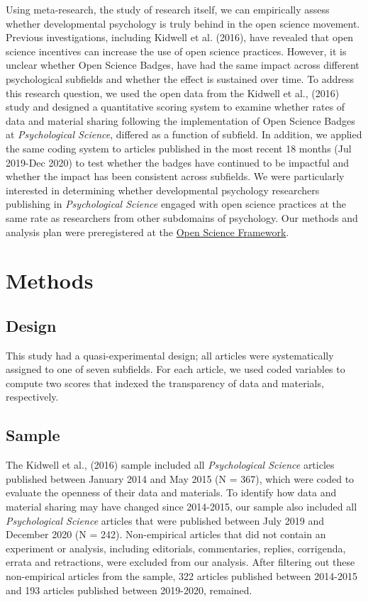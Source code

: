 \documentclass[
  english,
  man,floatsintext]{apa6}
\begin{document}
Using meta-research, the study of research itself, we can empirically assess whether developmental psychology is truly behind in the open science movement. Previous investigations, including Kidwell et al. (2016), have revealed that open science incentives can increase the use of open science practices. However, it is unclear whether Open Science Badges, have had the same impact across different psychological subfields and whether the effect is sustained over time. To address this research question, we used the open data from the Kidwell et al., (2016) study and designed a quantitative scoring system to examine whether rates of data and material sharing following the implementation of Open Science Badges at \emph{Psychological Science}, differed as a function of subfield. In addition, we applied the same coding system to articles published in the most recent 18 months (Jul 2019-Dec 2020) to test whether the badges have continued to be impactful and whether the impact has been consistent across subfields. We were particularly interested in determining whether developmental psychology researchers publishing in \emph{Psychological Science} engaged with open science practices at the same rate as researchers from other subdomains of psychology. Our methods and analysis plan were preregistered at the \href{https://osf.io/gqv9n/?view_only=b97cd4c4f6d645bc9e8870d97b6f3da4}{Open Science Framework}.

\hypertarget{methods}{%
\section{Methods}\label{methods}}

\hypertarget{design}{%
\subsection{Design}\label{design}}

This study had a quasi-experimental design; all articles were systematically assigned to one of seven subfields. For each article, we used coded variables to compute two scores that indexed the transparency of data and materials, respectively.

\hypertarget{sample}{%
\subsection{Sample}\label{sample}}

The Kidwell et al., (2016) sample included all \emph{Psychological Science} articles published between January 2014 and May 2015 (N = 367), which were coded to evaluate the openness of their data and materials. To identify how data and material sharing may have changed since 2014-2015, our sample also included all \emph{Psychological Science} articles that were published between July 2019 and December 2020 (N = 242). Non-empirical articles that did not contain an experiment or analysis, including editorials, commentaries, replies, corrigenda, errata and retractions, were excluded from our analysis. After filtering out these non-empirical articles from the sample, 322 articles published between 2014-2015 and 193 articles published between 2019-2020, remained.
\end{document}
